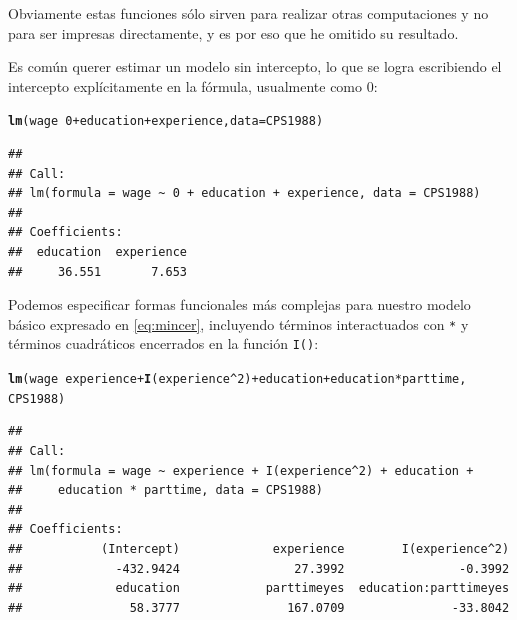 \documentclass{article}\usepackage[]{graphicx}\usepackage[]{color}
\makeatletter
\newcommand{\hlnum}[1]{\textcolor[rgb]{0.686,0.059,0.569}{#1}}%
\newcommand{\hlopt}[1]{\textcolor[rgb]{0,0,0}{#1}}%
\newcommand{\hlstd}[1]{\textcolor[rgb]{0.345,0.345,0.345}{#1}}%
\newcommand{\hlkwc}[1]{\textcolor[rgb]{0.333,0.667,0.333}{#1}}%
\newcommand{\hlkwd}[1]{\textcolor[rgb]{0.737,0.353,0.396}{\textbf{#1}}}%
\newenvironment{kframe}{%
 \def\at@end@of@kframe{}%
 \ifinner\ifhmode%
  \def\at@end@of@kframe{\end{minipage}}%
  \begin{minipage}{\columnwidth}%
 \fi\fi%
 \def\FrameCommand##1{\hskip\@totalleftmargin \hskip-\fboxsep
 \colorbox{shadecolor}{##1}\hskip-\fboxsep
     \hskip-\linewidth \hskip-\@totalleftmargin \hskip\columnwidth}%
 \MakeFramed {\advance\hsize-\width
   \@totalleftmargin\z@ \linewidth\hsize
   \@setminipage}}%
 {\par\unskip\endMakeFramed%
 \at@end@of@kframe}
\newenvironment{knitrout}{}{} %
\makeatother
\begin{document}
Obviamente estas funciones sólo sirven para realizar otras computaciones y no para ser impresas directamente, y es por eso que he omitido su resultado.

Es común querer estimar un modelo sin intercepto, lo que se logra escribiendo el intercepto explícitamente en la fórmula, usualmente como 0:

\begin{knitrout}
\color{fgcolor}\begin{kframe}
\begin{alltt}
\hlkwd{lm}\hlstd{(wage} \hlopt{~} \hlnum{0} \hlopt{+} \hlstd{education} \hlopt{+} \hlstd{experience,} \hlkwc{data} \hlstd{= CPS1988)}
\end{alltt}
\begin{verbatim}
## 
## Call:
## lm(formula = wage ~ 0 + education + experience, data = CPS1988)
## 
## Coefficients:
##  education  experience  
##     36.551       7.653
\end{verbatim}
\end{kframe}
\end{knitrout}

Podemos especificar formas funcionales más complejas para nuestro modelo básico expresado en \eqref{eq:mincer}, incluyendo términos interactuados con \verb|*| y términos cuadráticos encerrados en la función \verb|I()|:

\begin{knitrout}
\color{fgcolor}\begin{kframe}
\begin{alltt}
\hlkwd{lm}\hlstd{(wage} \hlopt{~} \hlstd{experience} \hlopt{+} \hlkwd{I}\hlstd{(experience}\hlopt{^}\hlnum{2}\hlstd{)} \hlopt{+} \hlstd{education} \hlopt{+} \hlstd{education}\hlopt{*}\hlstd{parttime,}
   \hlstd{CPS1988)}
\end{alltt}
\begin{verbatim}
## 
## Call:
## lm(formula = wage ~ experience + I(experience^2) + education + 
##     education * parttime, data = CPS1988)
## 
## Coefficients:
##           (Intercept)             experience        I(experience^2)  
##             -432.9424                27.3992                -0.3992  
##             education            parttimeyes  education:parttimeyes  
##               58.3777               167.0709               -33.8042
\end{verbatim}
\end{kframe}
\end{knitrout}
\end{document}
